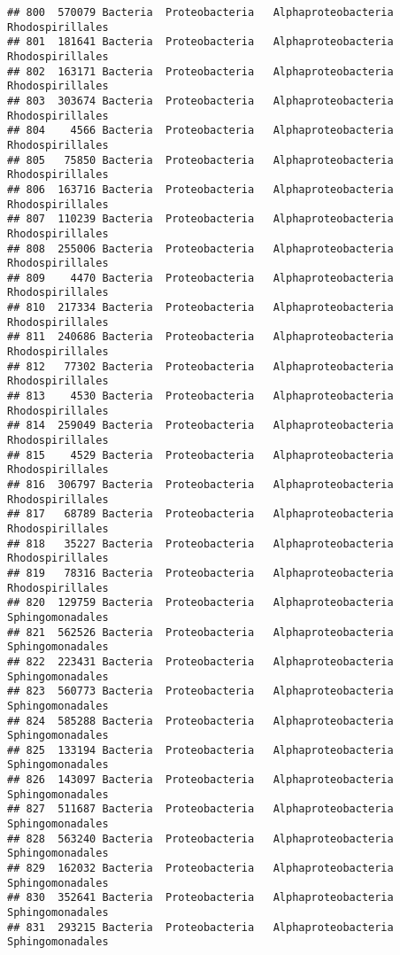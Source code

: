 \documentclass[
]{article}
\begin{document}
\begin{verbatim}
## 800  570079 Bacteria  Proteobacteria   Alphaproteobacteria    Rhodospirillales
## 801  181641 Bacteria  Proteobacteria   Alphaproteobacteria    Rhodospirillales
## 802  163171 Bacteria  Proteobacteria   Alphaproteobacteria    Rhodospirillales
## 803  303674 Bacteria  Proteobacteria   Alphaproteobacteria    Rhodospirillales
## 804    4566 Bacteria  Proteobacteria   Alphaproteobacteria    Rhodospirillales
## 805   75850 Bacteria  Proteobacteria   Alphaproteobacteria    Rhodospirillales
## 806  163716 Bacteria  Proteobacteria   Alphaproteobacteria    Rhodospirillales
## 807  110239 Bacteria  Proteobacteria   Alphaproteobacteria    Rhodospirillales
## 808  255006 Bacteria  Proteobacteria   Alphaproteobacteria    Rhodospirillales
## 809    4470 Bacteria  Proteobacteria   Alphaproteobacteria    Rhodospirillales
## 810  217334 Bacteria  Proteobacteria   Alphaproteobacteria    Rhodospirillales
## 811  240686 Bacteria  Proteobacteria   Alphaproteobacteria    Rhodospirillales
## 812   77302 Bacteria  Proteobacteria   Alphaproteobacteria    Rhodospirillales
## 813    4530 Bacteria  Proteobacteria   Alphaproteobacteria    Rhodospirillales
## 814  259049 Bacteria  Proteobacteria   Alphaproteobacteria    Rhodospirillales
## 815    4529 Bacteria  Proteobacteria   Alphaproteobacteria    Rhodospirillales
## 816  306797 Bacteria  Proteobacteria   Alphaproteobacteria    Rhodospirillales
## 817   68789 Bacteria  Proteobacteria   Alphaproteobacteria    Rhodospirillales
## 818   35227 Bacteria  Proteobacteria   Alphaproteobacteria    Rhodospirillales
## 819   78316 Bacteria  Proteobacteria   Alphaproteobacteria    Rhodospirillales
## 820  129759 Bacteria  Proteobacteria   Alphaproteobacteria    Sphingomonadales
## 821  562526 Bacteria  Proteobacteria   Alphaproteobacteria    Sphingomonadales
## 822  223431 Bacteria  Proteobacteria   Alphaproteobacteria    Sphingomonadales
## 823  560773 Bacteria  Proteobacteria   Alphaproteobacteria    Sphingomonadales
## 824  585288 Bacteria  Proteobacteria   Alphaproteobacteria    Sphingomonadales
## 825  133194 Bacteria  Proteobacteria   Alphaproteobacteria    Sphingomonadales
## 826  143097 Bacteria  Proteobacteria   Alphaproteobacteria    Sphingomonadales
## 827  511687 Bacteria  Proteobacteria   Alphaproteobacteria    Sphingomonadales
## 828  563240 Bacteria  Proteobacteria   Alphaproteobacteria    Sphingomonadales
## 829  162032 Bacteria  Proteobacteria   Alphaproteobacteria    Sphingomonadales
## 830  352641 Bacteria  Proteobacteria   Alphaproteobacteria    Sphingomonadales
## 831  293215 Bacteria  Proteobacteria   Alphaproteobacteria    Sphingomonadales

\end{verbatim}
\end{document}

